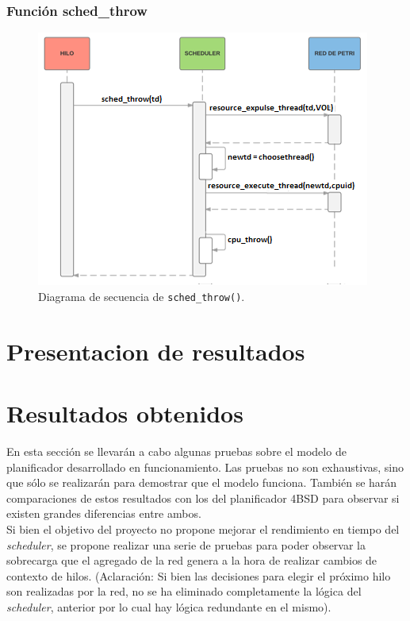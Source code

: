 \documentclass[a4paper]{book}
\begin{document}
\subsubsection{Funci\'on sched\_throw}

\begin{figure} [H]
	\begin{center}
        \includegraphics[scale=0.85]{./imagenes/sched_throw.png}
		\cprotect\caption{Diagrama de secuencia de \verb|sched_throw()|.}
	\end{center}
\end{figure}


\section{Presentacion de resultados}

\section{Resultados obtenidos}

En esta sección se llevarán a cabo algunas pruebas sobre el modelo de planificador desarrollado en funcionamiento. Las pruebas no son exhaustivas, sino que sólo se realizarán para demostrar que el modelo funciona. También se harán comparaciones de estos resultados con los del planificador 4BSD para observar si existen grandes diferencias entre ambos.\\

Si bien el objetivo del proyecto no propone mejorar el rendimiento en tiempo del \emph{scheduler}, se propone realizar una serie de pruebas para poder observar la sobrecarga que el agregado de la red genera a la hora de realizar cambios de contexto de hilos. (Aclaraci\'on: Si bien las decisiones para elegir el pr\'oximo hilo son realizadas por la red, no se ha eliminado completamente la l\'ogica del \emph{scheduler}, anterior por lo cual hay l\'ogica redundante en el mismo).\\
\end{document}
